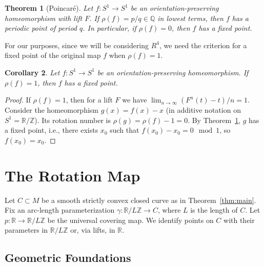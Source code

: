 \documentclass{article}
\newtheorem{theorem}{Theorem}[section]
\newtheorem{corollary}[theorem]{Corollary}
\begin{document}
\begin{theorem}[Poincaré]\label{thm:poincare}
    Let $f: S^1 \to S^1$ be an orientation-preserving homeomorphism with lift $F$. If $\rho(f) = p/q \in \mathbb{Q}$ in lowest terms, then $f$ has a periodic point of period $q$. In particular, if $\rho(f) = 0$, then $f$ has a fixed point.
\end{theorem}

For our purposes, since we will be considering $R^4$, we need the criterion for a fixed point of the original map $f$ when $\rho(f)=1$.

\begin{corollary}\label{cor:fixedpoint}
    Let $f: S^1 \to S^1$ be an orientation-preserving homeomorphism. If $\rho(f) = 1$, then $f$ has a fixed point.
\end{corollary}
\begin{proof}
    If $\rho(f)=1$, then for a lift $F$ we have $\lim_{n\to\infty} (F^n(t)-t)/n = 1$. Consider the homeomorphism $g(x) = f(x) - x$ (in additive notation on $S^1 = \mathbb{R}/\mathbb{Z}$). Its rotation number is $\rho(g) = \rho(f) - 1 = 0$. By Theorem~\ref{thm:poincare}, $g$ has a fixed point, i.e., there exists $x_0$ such that $f(x_0) - x_0 = 0 \mod 1$, so $f(x_0) = x_0$.
\end{proof}

\section{The Rotation Map}

Let $C \subset M$ be a smooth strictly convex closed curve as in Theorem~\ref{thm:main}. Fix an arc-length parameterization $\gamma: \mathbb{R}/L\mathbb{Z} \to C$, where $L$ is the length of $C$. Let $p: \mathbb{R} \to \mathbb{R}/L\mathbb{Z}$ be the universal covering map. We identify points on $C$ with their parameters in $\mathbb{R}/L\mathbb{Z}$ or, via lifts, in $\mathbb{R}$.

\subsection{Geometric Foundations}
\end{document}
